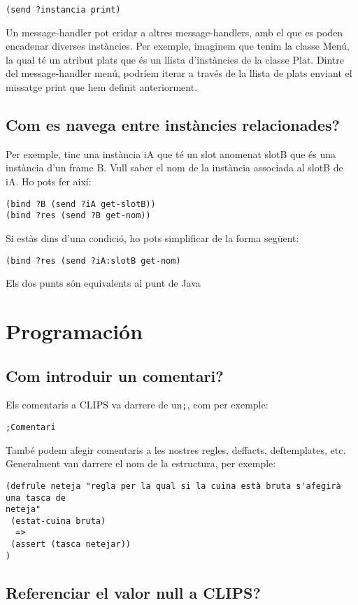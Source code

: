 \documentclass[11pt,svgnames]{scrbook}
\begin{document}
\texttt{(send ?instancia print)}
\medskip

Un message-handler pot cridar a altres message-handlers, amb el que es poden
encadenar diverses instàncies. Per exemple, imaginem que tenim la classe Menú,
la qual té un atribut plats que és un llista d'instàncies de la classe Plat.
Dintre del message-handler menú, podríem iterar a través de la llista de plats
enviant el missatge print que hem definit anteriorment.

	
\subsection{Com es navega entre instàncies relacionades?}
 Per exemple, tinc una instància iA
que té un slot anomenat slotB que és una instància d'un frame B. Vull saber el
nom de la instància associada al slotB de iA.
Ho pots fer així:

\begin{verbatim}
(bind ?B (send ?iA get-slotB))
(bind ?res (send ?B get-nom))
\end{verbatim} 

Si estàs dins d'una condició, ho pots simplificar de la forma següent:
\medskip

\texttt{(bind ?res (send ?iA:slotB get-nom)}
\medskip

Els dos punts són equivalents al punt de
Java



\section{Programación}
\subsection{Com introduir un comentari?}


Els comentaris a CLIPS va darrere de un\texttt{;}, com per exemple:
\medskip

\texttt{;Comentari}
\medskip

També podem afegir comentaris a les nostres regles, deffacts, deftemplates,
etc. Generalment van darrere el nom de la estructura, per exemple:

\begin{verbatim}
(defrule neteja "regla per la qual si la cuina està bruta s'afegirà una tasca de
neteja"
 (estat-cuina bruta)
  =>
 (assert (tasca netejar))
)
\end{verbatim}

\subsection{Referenciar el valor null a CLIPS?}
\end{document}
